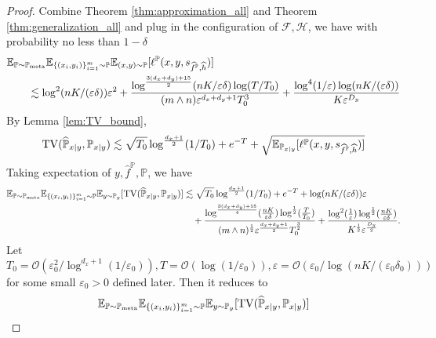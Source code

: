 \documentclass[11pt]{article}
\numberwithin{equation}{section}
\newcommand{\Pmeta}{\mathbb{P}_{\text{meta}}}
\renewcommand{\P}{\mathbb{P}}
\begin{document}
\begin{proof}
    Combine Theorem \ref{thm:approximation_all} and Theorem \ref{thm:generalization_all} and plug in the configuration of $\mathcal{F},\mathcal{H}$, we have with probability no less than $1-\delta$
    \begin{equation}
        \begin{aligned}
            &\E_{\P\sim\Pmeta}\E_{\{(x_i,y_i)\}_{i=1}^m\sim \P} \E_{(x,y)\sim\P} [\ell^\P(x,y,s_{\widehat{f}^\P,\widehat{h}})] \\
            &\qquad \lesssim 
            \log^2(nK/(\varepsilon\delta))\varepsilon^2+\frac{\log^{\frac{3(d_x+d_y)+15}{2}}(nK/\varepsilon\delta)\log(T/T_0)}{(m\wedge n)\varepsilon^{d_x+d_y+1}T_0^3}+\frac{\log^4(1/\varepsilon)\log(nK/(\varepsilon\delta))}{K\varepsilon^{D_y}}
        \end{aligned}
    \end{equation}
    By Lemma \ref{lem:TV_bound},
    \begin{equation}
        \mathrm{TV}(\widehat{\P}_{x|y},\P_{x|y})
        \lesssim \sqrt{T_0}\log^{\frac{d_x+1}{2}}(1/T_0)+e^{-T}+\sqrt{\E_{\P_{x|y}}[\ell^{\P}(x,y,s_{\widehat{f}^\P,\widehat{h}})]}
    \end{equation}
    Taking expectation of $y,\widehat{f}^\P,\P$, we have
    \begin{equation}
        \begin{aligned}
            \E_{\P\sim\Pmeta}\E_{\{(x_i,y_i)\}_{i=1}^m\sim \P}\E_{y\sim\P_y} [\mathrm{TV}(\widehat{\P}_{x|y},\P_{x|y})]
            &\lesssim \sqrt{T_0}\log^{\frac{d_x+1}{2}}(1/T_0)+e^{-T} + \log(nK/(\varepsilon\delta))\varepsilon \\
            &\quad +\frac{\log^{\frac{3(d_x+d_y)+15}{4}}(\frac{nK}{\varepsilon\delta})\log^{\frac{1}{2}}(\frac{T}{T_0})}{(m\wedge n)^{\frac{1}{2}}\varepsilon^{\frac{d_x+d_y+1}{2}}T_0^{\frac{3}{2}}}+\frac{\log^2(\frac{1}{\varepsilon})\log^{\frac{1}{2}}(\frac{nK}{\varepsilon\delta})}{K^{\frac{1}{2}}\varepsilon^{\frac{D_y}{2}}}.
        \end{aligned}
    \end{equation}
    Let $T_0=\mathcal{O}\left(\varepsilon_0^2/\log^{d_x+1}(1/\varepsilon_0)\right), T=\mathcal{O}(\log(1/\varepsilon_0)), \varepsilon=\mathcal{O}(\varepsilon_0/\log(nK/(\varepsilon_0\delta_0)))$ for some small $\varepsilon_0>0$ defined later.
    Then it reduces to
    \begin{equation}
        \begin{aligned}
            \E_{\P\sim\Pmeta}\E_{\{(x_i,y_i)\}_{i=1}^m\sim \P}\E_{y\sim\P_y} [\mathrm{TV}(\widehat{\P}_{x|y},\P_{x|y})]

\end{aligned}
\end{equation}
\end{proof}
\end{document}
